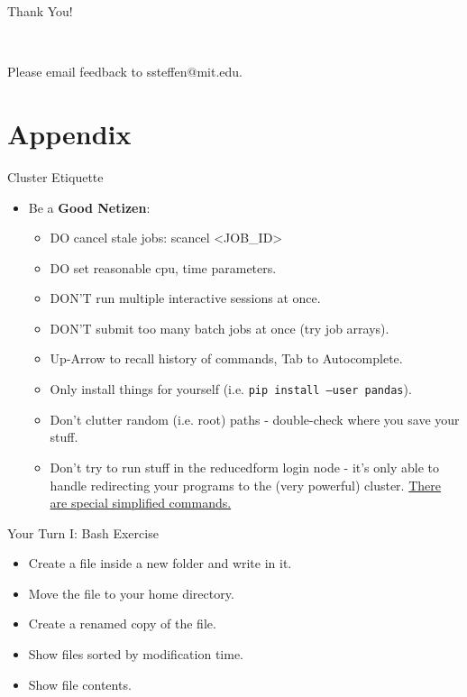 \documentclass{beamer}
\begin{document}
\begin{frame}
\Huge{\centerline{Thank You!}} \\
\bigskip
\bigskip
\normalsize{\centerline{Please email feedback to ssteffen@mit.edu.}}
\end{frame}

\section{Appendix}
\begin{frame}{Cluster Etiquette}
    \begin{itemize}
        \item Be a \textbf{Good Netizen}: 
        \begin{itemize}
            \item DO cancel stale jobs: scancel <JOB\_ID>
            \item DO set reasonable cpu, time parameters.
            \item DON'T run multiple interactive sessions at once.
            \item DON'T submit too many batch jobs at once (try job arrays).
            \item Up-Arrow to recall history of commands, Tab to Autocomplete.
            \item Only install things for yourself (i.e. \texttt{pip install --user pandas}).
            \item Don't clutter random (i.e. root) paths - double-check where you save your stuff.
            \item Don't try to run stuff in the reducedform login node - it's only able to handle redirecting your programs to the (very powerful) cluster. \href{https://econ-help.mit.edu/kb/useful-rf-command}{There are special simplified commands.}
        \end{itemize}
    \end{itemize}
\end{frame}

\begin{frame}{Your Turn I: Bash Exercise}
    \begin{itemize}
        \item Create a file inside a new folder and write in it. 
        \item Move the file to your home directory. 
        \item Create a renamed copy of the file.
        \item Show files sorted by modification time. 
        \item Show file contents.
    \end{itemize}
\end{frame}  
\end{document}

